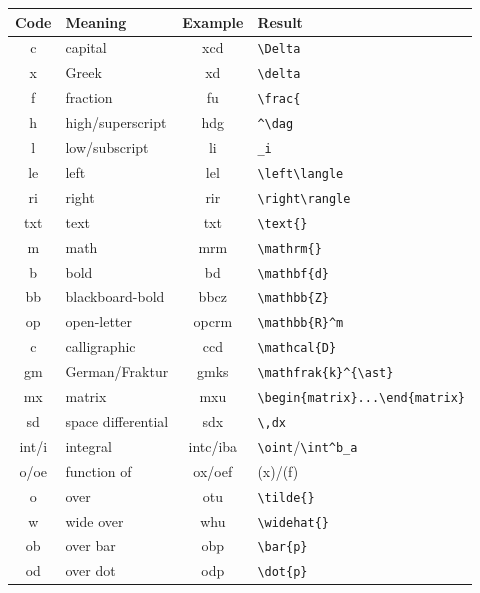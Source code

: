 \documentclass[11pt]{article}
\begin{document}
\begin{table}[tbh]
\begin{center}
  \begin{tabular}{>{\ttfamily}cl>{\ttfamily}c>{\ttfamily}l}
  \toprule
    \textnormal{Code} & Meaning & \textnormal{Example} & \textnormal{Result} \\
  \midrule
    c & capital           & xcd{}   & \verb.\Delta. \\
    x & Greek             & xd{}    & \verb.\delta. \\
    f & fraction          & fu{}    & \verb.\frac{. \\
    h & high/superscript{}& hdg{}   & \verb.^\dag. \\
    l & low/subscript{}   & li{}    & \verb._i. \\
    le& left              & lel{}   & \verb.\left\langle. \\
    ri& right             & rir{}   & \verb.\right\rangle. \\
   txt& text              & txt{}   & \verb.\text{}. \\
    m & math              & mrm{}   & \verb.\mathrm{}. \\
    b & bold{}            & bd{}    & \verb.\mathbf{d}. \\
    bb & blackboard-bold{}& bbcz{}  & \verb.\mathbb{Z}. \\
    op & open-letter      & opcrm{} & \verb.\mathbb{R}^m. \\
    c & calligraphic      & ccd{}   & \verb.\mathcal{D}. \\
    gm& German/Fraktur    & gmks{}  & \verb.\mathfrak{k}^{\ast}. \\
    mx& matrix            & mxu{}   & \verb'\begin{matrix}...\end{matrix}' \\
    sd& space differential& sdx{}   & \verb.\,dx. \\
    int/i& integral       & intc/iba{} & \verb.\oint./\verb.\int^b_a. \\
    o/oe & function of    & ox/oef{}& (x)/(f) \\
    o & over              & otu{}   & \verb.\tilde{}. \\
    w & wide over         & whu{}   & \verb.\widehat{}. \\
    ob& over bar          & obp{}   & \verb.\bar{p}. \\
    od& over dot          & odp{}   & \verb.\dot{p}. \\

\end{tabular}
\end{center}
\end{table}
\end{document}
